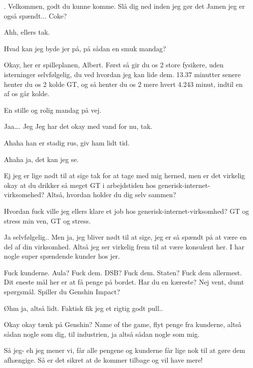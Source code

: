 \documentclass[a4paper,11pt]{article}
\begin{document}
\begin{sketch}

.
 Velkommen, godt du kunne komme. Slå dig ned inden jeg gør det
 Jamen jeg er også spændt...
Coke?

 Ahh, ellers tak.

 Hvad kan jeg byde jer på, på sådan en smuk mandag?

 Okay, her er spilleplanen, Albert. Først så gir du os 2 store fysikere, uden isterninger selvfølgelig, du ved hvordan jeg kan lide dem. 13.37 minutter senere henter du os 2 kolde GT, og så henter du os 2 mere hvert 4.243 minut, indtil en af os går kolde.

 En stille og rolig mandag på vej.

 Jaa…. Jeg Jeg har det okay med vand for nu, tak.

 Ahaha han er stadig rus, giv ham lidt tid.

 Ahaha ja, det kan jeg se.

 Ej jeg er lige nødt til at sige tak for at tage med mig herned, men er det virkelig okay at du drikker så meget GT i arbejdstiden hos generisk-internet-virksomehed? Altså, hvordan holder du dig selv sammen?

 Hvordan fuck ville jeg ellers klare et job hos generisk-internet-virksomhed? GT og stress min ven, GT og stress.

 Ja selvfølgelig.. Men ja, jeg bliver nødt til at sige, jeg er så spændt på at være en del af din virksomhed. Altså jeg ser virkelig frem til at være konsulent her. I har nogle super spændende kunder hos jer.

 Fuck kunderne. Aula? Fuck dem. DSB? Fuck dem. Staten? Fuck dem allermest. Dit eneste mål her er at få penge på bordet. Har du en kæreste? Nej vent, dumt spørgsmål. Spiller du Genshin Impact?

 Øhm ja, altså lidt. Faktisk fik jeg et rigtig godt pull..

 Okay okay tænk på Genshin? Name of the game, flyt penge fra kunderne, altså sådan nogle som dig, til industrien, ja altså sådan nogle som mig.

 Så jeg- eh jeg mener vi, får alle pengene og kunderne får lige nok til at gøre dem afhængige. Så er det sikret at de kommer tilbage og vil have mere!


\end{sketch}
\end{document}
